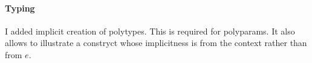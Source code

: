 \documentclass[acmsmall,screen,nonacm]{acmart}
\begin{document}
\paragraph{Typing}

\Xdidier
{I added implicit creation of polytypes. This is required for polyparams. It
also allows to illustrate a constryct whose implicitness is from the context
rather than from $e$. }







\end{document}
